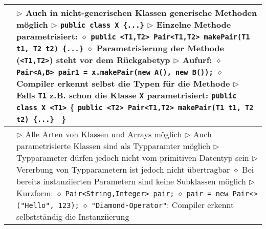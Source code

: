 \begin{longtable}{ | p{} p{} | }
	\makecell[l]{Generische Methoden} & \makecell[l]{
	$\rhd$ Auch in \textbf{nicht-generischen Klassen} generische Methoden möglich \\
	$\rhd$ \texttt{public class X \{...\}} \\
	$\rhd$ Einzelne Methode parametrisiert: \\
	\hspace{0.4cm} $\diamond$ \texttt{public <T1,T2> Pair<T1,T2> makePair(T1 t1, T2 t2) \{...\}} \\
	\hspace{0.4cm} $\diamond$ \textbf{Parametrisierung} der Methode (\texttt{<T1,T2>}) steht vor dem Rückgabetyp \\
	$\rhd$ Aufurf: \\
	\hspace{0.4cm} $\diamond$ \texttt{Pair<A,B> pair1 = x.makePair(new A(), new B());} \\
	\hspace{0.4cm} $\diamond$ Compiler erkennt selbst die Typen für die Methode \\
	$\rhd$ Falls \texttt{T1} z.B. schon die Klasse \texttt{X} parametrisiert: \\
	\hspace{0.8cm} \texttt{public class X <T1>} \{ \\
	\hspace{1.2cm} \texttt{public <T2> Pair<T1,T2> makePair(T1 t1, T2 t2) \{...\} } \\
	\hspace{0.8cm} \} } \\ \hline 

	\makecell[l]{Typparameter} & \makecell[l]{
	$\rhd$ Alle Arten von Klassen und Arrays möglich \\
	$\rhd$ Auch parametrisierte Klassen sind als Typparamter möglich \\
	$\rhd$ Typparameter dürfen jedoch nicht vom primitiven Datentyp sein \\
	$\rhd$ Vererbung von Typparametern ist jedoch nicht übertragbar \\ 
	\hspace{0.4cm} $\diamond$ Bei bereits instanziierten Parametern sind keine Subklassen möglich \\
	$\rhd$ Kurzform: \\
	\hspace{0.4cm} $\diamond$ \texttt{Pair<String,Integer> pair;} \\
	\hspace{0.4cm} $\diamond$ \texttt{pair = new Pair<> ("Hello", 123);} \\
	\hspace{0.4cm} $\diamond$ \texttt{"Diamond-Operator"}: Compiler erkennt selbstständig die Instanziierung } \\ \hline


\end{longtable}
